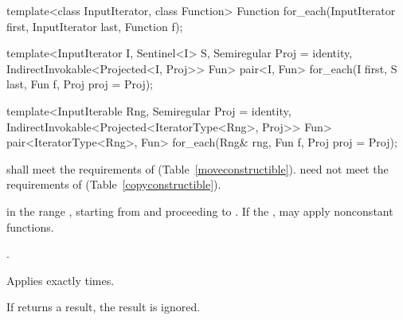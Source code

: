 %
\begin{removedblock}
\begin{itemdecl}
template<class InputIterator, class Function>
  Function for_each(InputIterator first, InputIterator last, Function f);
\end{itemdecl}
\end{removedblock}
\begin{addedblock}
\begin{itemdecl}
template<InputIterator I, Sentinel<I> S, Semiregular Proj = identity,
    IndirectInvokable<Projected<I, Proj>> Fun>
  pair<I, Fun>
    for_each(I first, S last, Fun f, Proj proj = Proj{});

template<InputIterable Rng, Semiregular Proj = identity,
    IndirectInvokable<Projected<IteratorType<Rng>, Proj>> Fun>
  pair<IteratorType<Rng>, Fun>
    for_each(Rng& rng, Fun f, Proj proj = Proj{});
\end{itemdecl}
\end{addedblock}

\begin{itemdescr}
\begin{removedblock}
\pnum
\requires {} shall meet the requirements of
 (Table~\ref{moveconstructible}).
\enternote {} need not meet the requirements of
 (Table~\ref{copyconstructible}). \exitnote
\end{removedblock}

\pnum
\effects
{} in the range
,
starting from
and proceeding to
.
\enternote If the ,  may apply
nonconstant functions.\exitnote

\pnum
\returns
{}.

\pnum
\complexity
Applies 
exactly
times.

\pnum
\notes
If  returns a result, the result is ignored.
\end{itemdescr}

